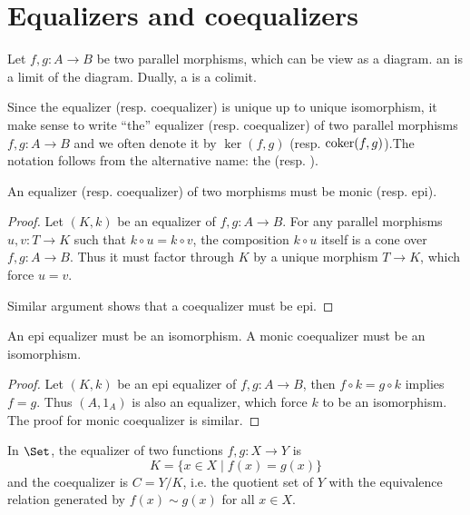 \newpage\section{Equalizers and coequalizers}
  \begin{defn}
    Let $f,g\colon A\to B$ be two parallel morphisms, which can be view as a diagram. an  is a limit of the diagram.     Dually, a  is a colimit.
  \end{defn}
  \begin{rem}
    Since the equalizer (resp. coequalizer) is unique up to unique isomorphism, it make sense to write ``the'' equalizer (resp. coequalizer) of two parallel morphisms $f,g\colon A\to B$ and we often denote it by $\ker(f,g)$ (resp. $\operatorname{coker}(f,g)$).The notation follows from the alternative name: the  (resp. ).
  \end{rem}

  \begin{prop}
    An equalizer (resp. coequalizer) of two morphisms must be monic (resp. epi).
  \end{prop}
  \begin{proof}
    Let $(K,k)$ be an equalizer of $f,g\colon A\to B$. For any parallel morphisms $u,v\colon T\to K$ such that $k\circ u=k\circ v$, the composition $k\circ u$ itself is a cone over $f,g\colon A\to B$. Thus it must factor through $K$ by a unique morphism $T\to K$, which force $u=v$.

    Similar argument shows that a coequalizer must be epi.
  \end{proof}

  \begin{prop}
    An epi equalizer must be an isomorphism. A monic coequalizer must be an isomorphism.
  \end{prop}
  \begin{proof}
    Let $(K,k)$ be an epi equalizer of $f,g\colon A\to B$, then $f\circ k=g\circ k$ implies $f=g$. Thus $(A,1_{A})$ is also an equalizer, which force $k$ to be an isomorphism. The proof for monic coequalizer is similar.
  \end{proof}

  \begin{exam}
    In $\Set$, the equalizer of two functions $f,g\colon X\to Y$ is
    \begin{equation*}
      K=\{x\in X\mid f(x)=g(x)\}
    \end{equation*}
    and the coequalizer is $C=Y/K$, i.e. the quotient set of $Y$ with the equivalence relation generated by $f(x)\sim g(x)$ for all $x\in X$.
  \end{exam}

